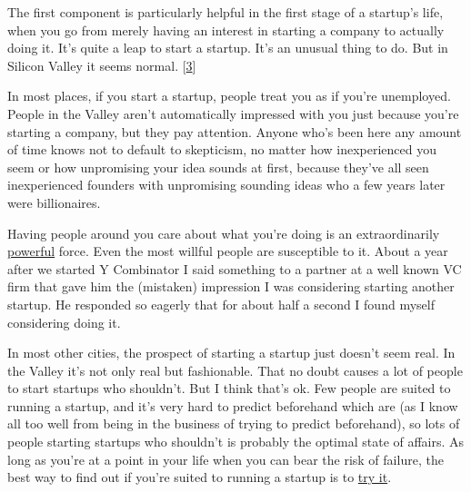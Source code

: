 The first
                    component is particularly helpful in the first stage of a
                    startup's life, when you go from merely having an interest
                    in starting a company to actually doing it. It's quite a
                    leap to start a startup. It's an unusual thing to do. But in
                    Silicon Valley it seems normal.
                    [\href{\#f3n}{3}]

In most places, if you start a startup, people
                    treat you as if you're unemployed. People in the Valley
                    aren't automatically impressed with you just because you're
                    starting a company, but they pay attention. Anyone who's
                    been here any amount of time knows not to default to
                    skepticism, no matter how inexperienced you seem or how
                    unpromising your idea sounds at first, because they've all
                    seen inexperienced founders with unpromising sounding ideas
                    who a few years later were billionaires.

Having
                    people around you care about what you're doing is an
                    extraordinarily \href{http://www.paulgraham.com/cities.html}{powerful} force.
                    Even the most willful people are susceptible to it. About a
                    year after we started Y Combinator I said something to a
                    partner at a well known VC firm that gave him the (mistaken)
                    impression I was considering starting another startup. He
                    responded so eagerly that for about half a second I found
                    myself considering doing it.

In most other
                    cities, the prospect of starting a startup just doesn't seem
                    real. In the Valley it's not only real but fashionable. That
                    no doubt causes a lot of people to start startups who
                    shouldn't. But I think that's ok. Few people are suited to
                    running a startup, and it's very hard to predict beforehand
                    which are (as I know all too well from being in the business
                    of trying to predict beforehand), so lots of people starting
                    startups who shouldn't is probably the optimal state of
                    affairs. As long as you're at a point in your life when you
                    can bear the risk of failure, the best way to find out if
                    you're suited to running a startup is to
                    \href{http://www.paulgraham.com/notnot.html}{try it}.

